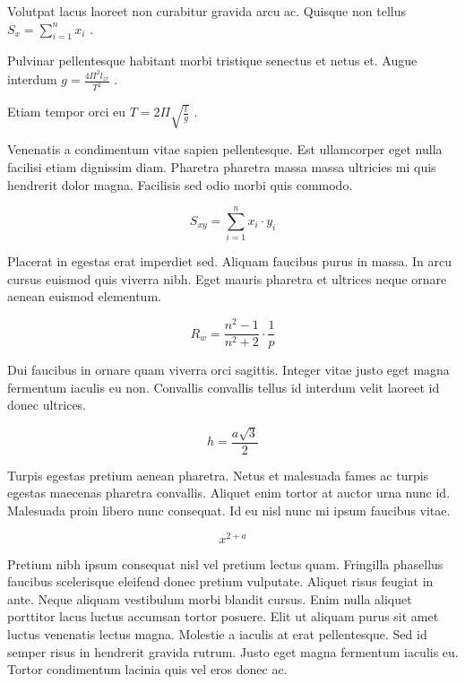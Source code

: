 \documentclass{article}
\begin{document}
Volutpat lacus laoreet non curabitur gravida arcu ac. Quisque non tellus
 \begin{math}
	S_x=\sum_{i=1}^{n}x_i
\end{math}
.\newline

Pulvinar pellentesque habitant morbi tristique senectus et netus et. Augue interdum 
$ g=\frac{4\Pi^2l_{zr}}{T^2} $
.\newline

Etiam tempor orci eu 
\( T=2\Pi \sqrt{\frac{l}{g}} \)
.\newline

Venenatis a condimentum vitae sapien pellentesque. Est ullamcorper eget nulla facilisi etiam dignissim diam. Pharetra pharetra massa massa ultricies mi quis hendrerit dolor magna. Facilisis sed odio morbi quis commodo.

\[ S_{xy}=\sum_{i=1}^{n}x_i\cdot y_i \]

Placerat in egestas erat imperdiet sed. Aliquam faucibus purus in massa. In arcu cursus euismod quis viverra nibh. Eget mauris pharetra et ultrices neque ornare aenean euismod elementum.

$$ R_w=\frac{n^2-1}{n^2+2} \cdot \frac{1}{p} $$

Dui faucibus in ornare quam viverra orci sagittis. Integer vitae justo eget magna fermentum iaculis eu non. Convallis convallis tellus id interdum velit laoreet id donec ultrices. 

\begin{displaymath}
	h=\frac{a\sqrt{3}}{2}
\end{displaymath}

Turpis egestas pretium aenean pharetra. Netus et malesuada fames ac turpis egestas maecenas pharetra convallis. Aliquet enim tortor at auctor urna nunc id. Malesuada proin libero nunc consequat. Id eu nisl nunc mi ipsum faucibus vitae.

\begin{equation}
	x^{2+a}
\end{equation}

Pretium nibh ipsum consequat nisl vel pretium lectus quam. Fringilla phasellus faucibus scelerisque eleifend donec pretium vulputate. Aliquet risus feugiat in ante. Neque aliquam vestibulum morbi blandit cursus. Enim nulla aliquet porttitor lacus luctus accumsan tortor posuere. Elit ut aliquam purus sit amet luctus venenatis lectus magna. Molestie a iaculis at erat pellentesque. Sed id semper risus in hendrerit gravida rutrum. Justo eget magna fermentum iaculis eu. Tortor condimentum lacinia quis vel eros donec ac.
\end{document}
